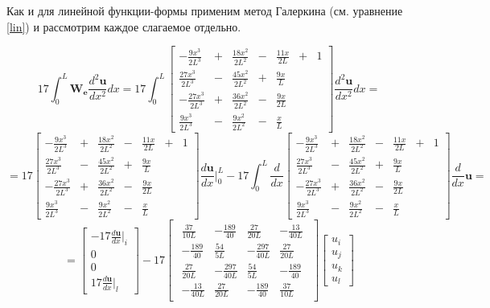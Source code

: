 Как и для линейной функции-формы применим метод Галеркина (см. уравнение \ref{lin}) и рассмотрим каждое слагаемое отдельно.

$$17 \int_0^L \mathbf{W_e} \frac{d^2 \mathbf{u}}{dx^2} dx
=
17\int_0^L
\begin{bmatrix}
	-\frac{9x^3}{2L^3}&+&\frac{18x^2}{2L^2}&-&\frac{11x}{2L} &+& 1\\
	\frac{27x^3}{2L^3}&-&\frac{45x^2}{2L^2}&+&\frac{9x}{L}&&\\
	-\frac{27x^3}{2L^3}&+&\frac{36x^2}{2L^2}&-&\frac{9x}{2L}&&\\
	\frac{9x^3}{2L^3}&-&\frac{9x^2}{2L^2}&-&\frac{x}{L}&&
\end{bmatrix}
\frac{d^2 \mathbf{u}}{dx^2} dx
=
$$
$$
=
17
\begin{bmatrix}
	-\frac{9x^3}{2L^3}&+&\frac{18x^2}{2L^2}&-&\frac{11x}{2L} &+& 1\\
	\frac{27x^3}{2L^3}&-&\frac{45x^2}{2L^2}&+&\frac{9x}{L}&&\\
	-\frac{27x^3}{2L^3}&+&\frac{36x^2}{2L^2}&-&\frac{9x}{2L}&&\\
	\frac{9x^3}{2L^3}&-&\frac{9x^2}{2L^2}&-&\frac{x}{L}&&
\end{bmatrix}
\frac{d\mathbf{u}}{dx} |_0^L
  -17  \int_0^L \frac{d}{dx}
\begin{bmatrix}
	-\frac{9x^3}{2L^3}&+&\frac{18x^2}{2L^2}&-&\frac{11x}{2L} &+& 1\\
	\frac{27x^3}{2L^3}&-&\frac{45x^2}{2L^2}&+&\frac{9x}{L}&&\\
	-\frac{27x^3}{2L^3}&+&\frac{36x^2}{2L^2}&-&\frac{9x}{2L}&&\\
	\frac{9x^3}{2L^3}&-&\frac{9x^2}{2L^2}&-&\frac{x}{L}&&
\end{bmatrix}
\frac{d}{dx} \mathbf{u}
=$$
$$
=
\begin{bmatrix}
	  -17 \frac{d\mathbf{u}}{dx}|_i \\
	0\\
	0\\
17\frac{d\mathbf{u}}{dx}|_l
\end{bmatrix}
  -17 
\begin{bmatrix}
\begin{array}{rrrr}
	\frac{37}{10L} & -\frac{189}{40} & \frac{27}{20L} & -\frac{13}{40L}\\
	-\frac{189}{40} & \frac{54}{5L} & -\frac{297}{40L} & \frac{27}{20L}\\
	\frac{27}{20L} &  -\frac{297}{40L} & \frac{54}{5L} & -\frac{189}{40}\\
	-\frac{13}{40L} & \frac{27}{20L} & -\frac{189}{40} & \frac{37}{10L}
\end{array}
\end{bmatrix}
\begin{bmatrix}
u_i \\
u_j \\
u_k\\
u_l
\end{bmatrix}
$$


